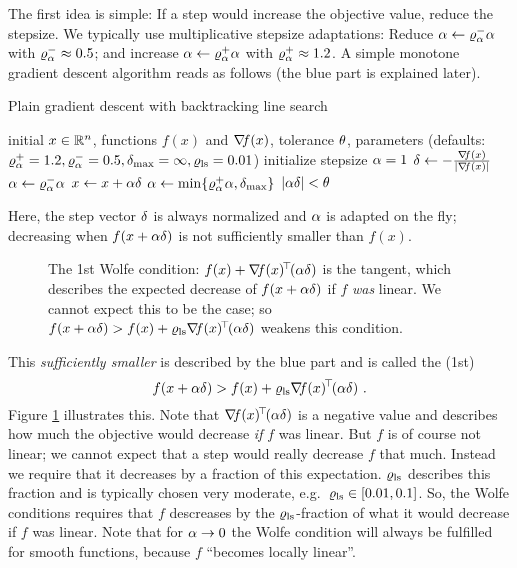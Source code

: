 The first idea is simple: If a step would increase the objective
value, reduce the stepsize. We typically use multiplicative stepsize
adaptations: Reduce $\alpha \gets \varrho_\alpha^- \alpha$ with $\varrho_\alpha^-\approx 0.5$; and
increase $\alpha \gets \varrho_\alpha^+\alpha$ with $\varrho_\alpha^+\approx 1.2$. A simple
monotone gradient descent algorithm reads as follows (the blue part is explained later).
\begin{algorithm}
\caption{\label{alg2} Plain gradient descent with backtracking line search}
\begin{algorithmic}[1]
\Require initial $x\in{\mathbb{R}}^n$, functions $f(x)$ and ${\nabla_{\!\!}} f(x)$,
tolerance $\theta$, parameters (defaults:
$\varrho_\alpha^+=1.2, \varrho_\alpha^-=0.5, {\delta}_{\text{max}}=\infty, \varrho_{\text{ls}}=0.01$)
\State initialize stepsize $\alpha=1$
\Repeat
\State ${\delta} \gets -\frac{{\nabla_{\!\!}} f(x)}{|{\nabla_{\!\!}}
f(x)|}$ 
 
\State $\alpha \gets \varrho_\alpha^- \alpha$ 
\EndWhile
\State $x \gets x + \alpha{\delta}$
\State $\alpha \gets \min\{\varrho_\alpha^+\alpha,{\delta}_{\text{max}}\}$ 
\Until $|\alpha{\delta}| <\theta$ ~ 
\end{algorithmic}
\end{algorithm}
Here, the step vector ${\delta}$ is always normalized and $\alpha$ is
adapted on the fly; decreasing when $f(x+\alpha{\delta})$ is not
sufficiently smaller than $f(x)$.

\begin{figure}
\caption{\label{figWolfe} The 1st Wolfe condition: $f(x) + {\nabla_{\!\!}} f(x)^{\!\top\!}
(\alpha{\delta})$ is the tangent, which describes the expected decrease of
$f(x+\alpha{\delta})$ if $f$ \emph{was} linear. We cannot expect this to be
the case; so  $f(x+\alpha{\delta}) > f(x) + \varrho_{\text{ls}} {\nabla_{\!\!}} f(x)^{\!\top\!} (\alpha{\delta})$
weakens this condition.}
\end{figure}

This \emph{sufficiently smaller} is described by the blue part and is
called the (1st) 
\begin{equation}
f(x+\alpha{\delta}) > f(x) + \varrho_{\text{ls}} {\nabla_{\!\!}} f(x)^{\!\top\!} (\alpha{\delta}) ~.
\end{equation}
Figure \ref{figWolfe} illustrates this. Note that ${\nabla_{\!\!}} f(x)^{\!\top\!}
(\alpha{\delta})$ is a negative value and describes how much the objective
would decrease \emph{if} $f$ was linear. But $f$ is of course not
linear; we cannot expect that a step would really decrease $f$ that
much. Instead we require that it decreases by a fraction of this
expectation. $\varrho_{\text{ls}}$ describes this fraction and is typically chosen
very moderate, e.g.\ $\varrho_{\text{ls}}\in[0.01,0.1]$. So, the Wolfe conditions
requires that $f$ descreases by the $\varrho_{\text{ls}}$-fraction of what it
would decrease if $f$ was linear. Note that for $\alpha\to 0$ the Wolfe
condition will always be fulfilled for smooth functions, because $f$ ``becomes locally
linear''.

